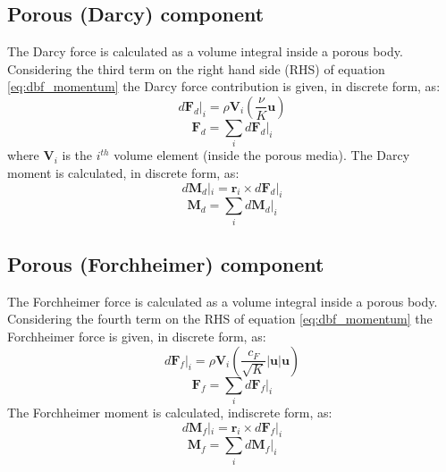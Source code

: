 \documentclass[a4paper,11pt]{report}
\begin{document}
\subsection{Porous (Darcy) component}
\label{subsec:darcy}

The Darcy force is calculated as a volume integral inside a porous body. Considering the third term on the right hand side (RHS) of equation \ref{eq:dbf_momentum} the Darcy force contribution is given, in discrete form, as:
\begin{equation}
    d\mathbf{F}_d|_i = \rho\mathbf{V}_i(\frac{\nu}{K}\mathbf{u})
    \label{eq:dFdi}
\end{equation}
\begin{equation}
    \mathbf{F}_d = \sum_i d\mathbf{F}_d|_i
    \label{eq:Fd}
\end{equation}
where $\mathbf{V}_i$ is the $i^{th}$ volume element (inside the porous media). The Darcy moment is calculated, in discrete form, as:
\begin{equation}
    d\mathbf{M}_d|_i = \mathbf{r}_i\times d\mathbf{F}_d|_i
    \label{eq:dMdi}
\end{equation}
\begin{equation}
    \mathbf{M}_d = \sum_i d\mathbf{M}_d|_i
    \label{eq:Md}
\end{equation}

\subsection{Porous (Forchheimer) component}
\label{subsec:forchheimer}

The Forchheimer force is calculated as a volume integral inside a porous body. Considering the fourth term on the RHS of equation \ref{eq:dbf_momentum} the Forchheimer force is given, in discrete form, as:
\begin{equation}
    d\mathbf{F}_f|_i = \rho\mathbf{V}_i(\frac{c_{F}}{\sqrt{K}}\lvert\mathbf{u}\rvert\mathbf{u})
    \label{eq:dFfi}
\end{equation}
\begin{equation}
    \mathbf{F}_f = \sum_i d\mathbf{F}_f|_i
    \label{eq:Ff}
\end{equation}
The Forchheimer moment is calculated, indiscrete form, as:
\begin{equation}
    d\mathbf{M}_f|_i = \mathbf{r}_i\times d\mathbf{F}_f|_i
    \label{eq:dMfi}
\end{equation}
\begin{equation}
    \mathbf{M}_f = \sum_i d\mathbf{M}_f|_i
    \label{eq:Mf}
\end{equation}
\end{document}
